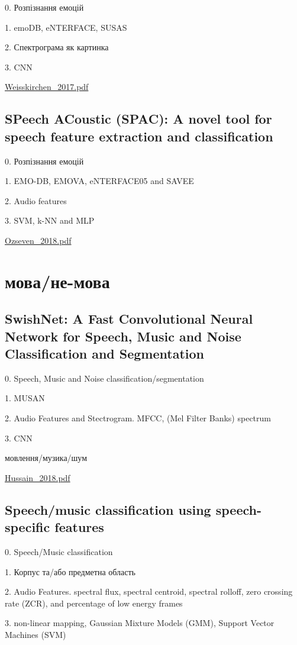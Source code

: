 0. Розпізнання емоцій

1. emoDB, eNTERFACE, SUSAS

2. Спектрограма як картинка

3. CNN

\url{Weisskirchen_2017.pdf}\cite{Weisskirchen_2017}

\subsection{SPeech ACoustic (SPAC): A novel tool for speech feature extraction and classification}

0. Розпізнання емоцій

1. EMO-DB, EMOVA, eNTERFACE05 and SAVEE

2. Audio features

3.  SVM, k-NN and MLP

\url{Ozseven_2018.pdf}\cite{Ozseven_2018}

\section{мова/не-мова}

\subsection{SwishNet: A Fast Convolutional Neural Network for Speech, Music and Noise Classification and Segmentation}

0. Speech, Music and Noise classification/segmentation

1. MUSAN

2. Audio Features and Stectrogram. MFCC, (Mel Filter Banks) spectrum

3. CNN

мовлення/музика/шум

\url{Hussain_2018.pdf}\cite{Hussain_2018}

\subsection{Speech/music classification using speech-specific features}

0. Speech/Music classification

1. Корпус та/або предметна область

2. Audio Features. spectral flux, spectral centroid, spectral rolloff, zero crossing rate (ZCR), and percentage of low energy frames

3. non-linear mapping, Gaussian Mixture Models (GMM), Support Vector Machines (SVM)

